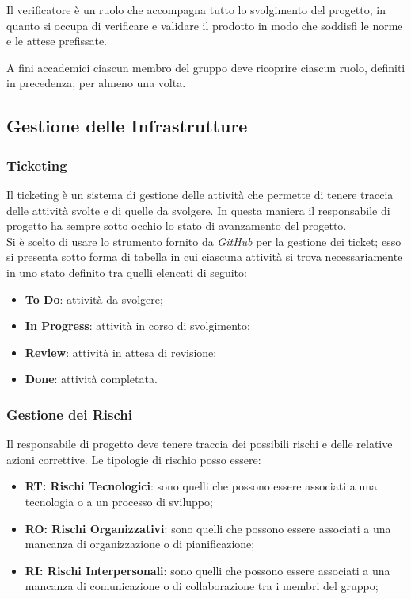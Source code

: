         Il verificatore è un ruolo che accompagna tutto lo svolgimento del progetto, in quanto si occupa di verificare e validare il prodotto in modo che soddisfi le norme e le attese prefissate.
        \bigskip
        \begin{flushleft}
        A fini accademici ciascun membro del gruppo deve ricoprire ciascun ruolo, definiti in precedenza, per almeno una volta.
        \end{flushleft}


    \subsection{Gestione delle Infrastrutture}
        \subsubsection{Ticketing} 
        Il ticketing è un sistema di gestione delle attività che permette di tenere traccia delle attività svolte e di quelle da svolgere. In questa maniera il responsabile di progetto ha sempre sotto occhio lo stato di avanzamento del progetto. \\
        Si è scelto di usare lo strumento fornito da \textit{GitHub} per la gestione dei ticket; esso si presenta sotto forma di tabella in cui ciascuna attività si trova necessariamente in uno stato definito tra quelli elencati di seguito:
        \begin{itemize}
            \item \textbf{To Do}: attività da svolgere;
            \item \textbf{In Progress}: attività in corso di svolgimento;
            \item \textbf{Review}: attività in attesa di revisione;
            \item \textbf{Done}: attività completata.
        \end{itemize}

        \subsubsection{Gestione dei Rischi} 
        Il responsabile di progetto deve tenere traccia dei possibili rischi e delle relative azioni correttive.
        Le tipologie di rischio posso essere:
        \begin{itemize}
            \item \textbf{RT: Rischi Tecnologici}: sono quelli che possono essere associati a una tecnologia o a un processo di sviluppo;
            \item \textbf{RO: Rischi Organizzativi}: sono quelli che possono essere associati a una mancanza di organizzazione o di pianificazione;
            \item \textbf{RI: Rischi Interpersonali}: sono quelli che possono essere associati a una mancanza di comunicazione o di collaborazione tra i membri del gruppo;
        \end{itemize}
